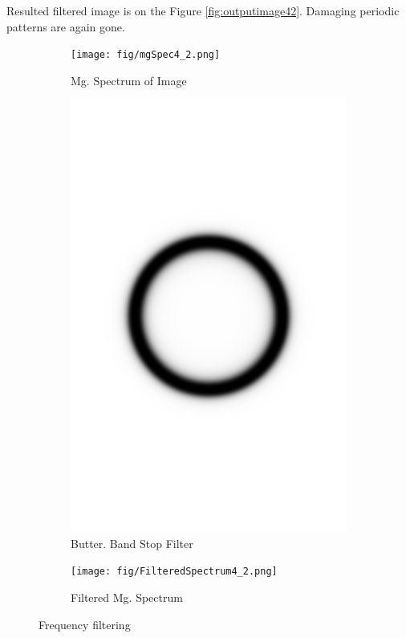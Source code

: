 \documentclass[11pt]{article}
\numberwithin{equation}{section}
\begin{document}
Resulted filtered image is on the Figure \ref{fig:outputimage42}. Damaging periodic patterns are again gone.

\begin{figure}[h]
	\centering
	\begin{subfigure}[b]{0.3\textwidth}
		\texttt{[image: fig/mgSpec4\_2.png]}
		\caption{Mg. Spectrum of Image}
		\label{fig:imgMagSpec42}
	\end{subfigure} \quad
	\begin{subfigure}[b]{0.3\textwidth}
		\includegraphics[width=\textwidth]{fig/bandRF4_2.png}
		\caption{Butter. Band Stop Filter}
		\label{fig:buttnotchfilter42}
	\end{subfigure}\quad
	\begin{subfigure}[b]{0.3\textwidth}
		\texttt{[image: fig/FilteredSpectrum4\_2.png]}
		\caption{Filtered Mg. Spectrum}
		\label{fig:filteredMgSpectrum42}
	\end{subfigure}
	\caption{Frequency filtering}
	\label{fig:magspecs42}
\end{figure}

\newpage


\end{document}
